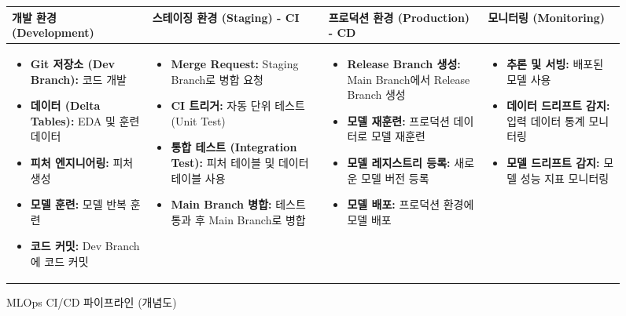 \documentclass[11pt,a4paper]{article}
\theoremstyle{definition}
\begin{document}
\begin{figure}[h!]
    \centering
    \caption{MLOps CI/CD 파이프라인 (개념도)}
    \label{fig:mlops_cicd}
    \begin{adjustbox}{width=\textwidth}
    \begin{tabular}{p{} | p{} | p{} | p{}}
    \toprule
    \textbf{개발 환경 (Development)} & \textbf{스테이징 환경 (Staging) - CI} & \textbf{프로덕션 환경 (Production) - CD} & \textbf{모니터링 (Monitoring)} \\
    \midrule
    \begin{itemize}
        \item \textbf{Git 저장소 (Dev Branch):} 코드 개발
        \item \textbf{데이터 (Delta Tables):} EDA 및 훈련 데이터
        \item \textbf{피처 엔지니어링:} 피처 생성
        \item \textbf{모델 훈련:} 모델 반복 훈련
        \item \textbf{코드 커밋:} Dev Branch에 코드 커밋
    \end{itemize} &
    \begin{itemize}
        \item \textbf{Merge Request:} Staging Branch로 병합 요청
        \item \textbf{CI 트리거:} 자동 단위 테스트 (Unit Test)
        \item \textbf{통합 테스트 (Integration Test):} 피처 테이블 및 데이터 테이블 사용
        \item \textbf{Main Branch 병합:} 테스트 통과 후 Main Branch로 병합
    \end{itemize} &
    \begin{itemize}
        \item \textbf{Release Branch 생성:} Main Branch에서 Release Branch 생성
        \item \textbf{모델 재훈련:} 프로덕션 데이터로 모델 재훈련
        \item \textbf{모델 레지스트리 등록:} 새로운 모델 버전 등록
        \item \textbf{모델 배포:} 프로덕션 환경에 모델 배포
    \end{itemize} &
    \begin{itemize}
        \item \textbf{추론 및 서빙:} 배포된 모델 사용
        \item \textbf{데이터 드리프트 감지:} 입력 데이터 통계 모니터링
        \item \textbf{모델 드리프트 감지:} 모델 성능 지표 모니터링

\end{itemize}
\end{tabular}
\end{adjustbox}
\end{figure}
\end{document}
